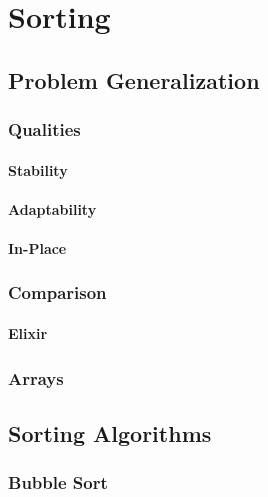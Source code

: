 \chapter{Sorting}


\section{Problem Generalization}

\subsection{Qualities}

\subsubsection{Stability}
\subsubsection{Adaptability}
\subsubsection{In-Place}

\subsection{Comparison}
\subsubsection{\csharp}
\subsubsection{Elixir}

\subsection{Arrays}

\section{Sorting Algorithms}

\subsection{Bubble Sort}
\subsubsection{\csharp}

